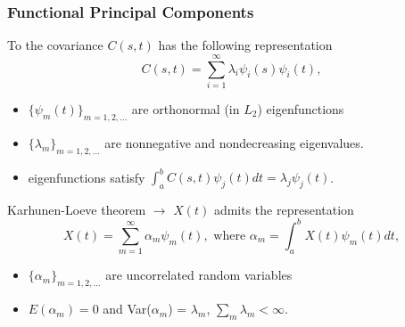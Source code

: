 \documentclass{beamer}
\begin{document}


\begin{frame}
\frametitle{Functional Principal Components}
To the covariance $C(s,t)$ has the following representation 
\begin{equation*} 
 C(s,t) = \sum_{i=1}^{\infty}\lambda_i\psi_i(s)\psi_i(t),
\end{equation*}
\begin{itemize}
\item  $\{\psi_m(t)\}_{m=1,2,\ldots}$ are orthonormal (in $L_2$) eigenfunctions
\item  $\{\lambda_m \}_{m=1,2,\ldots}$ are nonnegative and nondecreasing eigenvalues. 
\item eigenfunctions satisfy $\int_a^bC(s,t)\psi_j(t)dt = \lambda_j\psi_j(t)$. 
\end{itemize}
Karhunen-Loeve theorem $\rightarrow$ $X(t)$ admits the representation
\begin{equation*}
X(t) =  \sum_{m=1}^{\infty}\alpha_m \psi_m(t), \mbox{ where  } \alpha_m = \int_a^b X(t) \psi_m(t)dt,
\end{equation*}
\begin{itemize}
\item $\{\alpha_m \}_{m=1,2,\ldots}$ are uncorrelated random variables
\item $E(\alpha_m)=0$ and Var($\alpha_m$) = $\lambda_m$, $\sum_m \lambda_m < \infty$. 
\end{itemize}
\end{frame}
\end{document}
